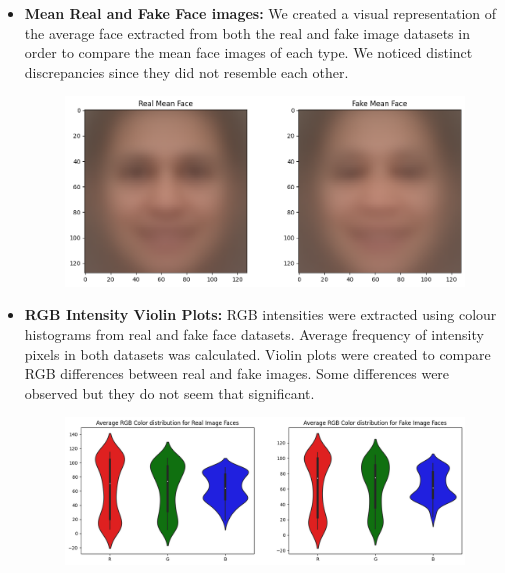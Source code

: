 \documentclass[10pt,twocolumn,letterpaper]{article}
\begin{document}
\begin{itemize}
    \item \textbf{Mean Real and Fake Face images:} We created a visual representation of the average face extracted from both the real and fake image datasets in order to compare the mean face images of each type. We noticed distinct discrepancies since they did not resemble each other.
    \begin{figure}[H]
    \centering
    \includegraphics[scale=0.2]{4.png}
    \end{figure}

    \item \textbf{RGB Intensity Violin Plots:} RGB intensities were extracted using colour histograms from real and fake face datasets. Average frequency of intensity pixels in both datasets was calculated. Violin plots were created to compare RGB differences between real and fake images. Some differences were observed but they do not seem that significant.
    \begin{figure}[H]
    \centering
    \includegraphics[scale=0.2]{5.png}
    \end{figure}


\end{itemize}
\end{document}
